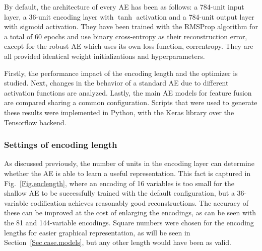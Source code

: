 By default, the architecture of every AE has been as follows: a 784-unit input layer, a 36-unit encoding layer with $\tanh$ activation and a 784-unit output layer with sigmoid activation. They have been trained with the RMSProp algorithm for a total of 60 epochs and use binary cross-entropy as their reconstruction error, except for the robust AE which uses its own loss function, correntropy. They are all provided identical weight initializations  and hyperparameters.

Firstly, the performance impact of the encoding length and the optimizer  is studied. Next, changes in the behavior of a standard AE due to different activation functions are analyzed. Lastly, the main AE models for feature fusion are compared sharing a common configuration. Scripts that were used to generate these results were implemented in Python, with the Keras library over the Tensorflow backend.

\subsubsection{Settings of encoding length}
As discussed previously, the number of units in the encoding layer can determine whether the AE is able to learn a useful representation. This fact is captured in Fig.~\ref{Fig.enclength}, where an encoding of 16 variables is too small for the shallow AE to be successfully trained with the default configuration, but a 36-variable codification achieves reasonably good reconstructions. The accuracy of these can be improved at the cost of enlarging the encodings, as can be seen with the 81 and 144-variable encodings. Square numbers were chosen for the encoding lengths for easier graphical representation, as will be seen in Section~\ref{Sec.case.models}, but any other length would have been as valid.

